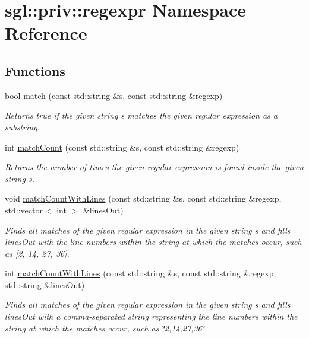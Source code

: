 \hypertarget{namespacesgl_1_1priv_1_1regexpr}{}\section{sgl\+:\+:priv\+:\+:regexpr Namespace Reference}
\label{namespacesgl_1_1priv_1_1regexpr}
\subsection*{Functions}
\begin{DoxyCompactItemize}
\item 
bool \mbox{\hyperlink{namespacesgl_1_1priv_1_1regexpr_ac209c2d2280a26805a88a5830572c4e8}{match}} (const std\+::string \&s, const std\+::string \&regexp)
\begin{DoxyCompactList}\small\item\em Returns true if the given string s matches the given regular expression as a substring. \end{DoxyCompactList}\item 
int \mbox{\hyperlink{namespacesgl_1_1priv_1_1regexpr_ae0041d7f4268e3f1cc914a014b4c6966}{match\+Count}} (const std\+::string \&s, const std\+::string \&regexp)
\begin{DoxyCompactList}\small\item\em Returns the number of times the given regular expression is found inside the given string s. \end{DoxyCompactList}\item 
void \mbox{\hyperlink{namespacesgl_1_1priv_1_1regexpr_a5854e1254f8393744e2c10c998197f96}{match\+Count\+With\+Lines}} (const std\+::string \&s, const std\+::string \&regexp, std\+::vector$<$ int $>$ \&lines\+Out)
\begin{DoxyCompactList}\small\item\em Finds all matches of the given regular expression in the given string s and fills \textquotesingle{}lines\+Out\textquotesingle{} with the line numbers within the string at which the matches occur, such as \mbox{[}2, 14, 27, 36\mbox{]}. \end{DoxyCompactList}\item 
int \mbox{\hyperlink{namespacesgl_1_1priv_1_1regexpr_a5563a971ef7227d5d4f363243dfed74d}{match\+Count\+With\+Lines}} (const std\+::string \&s, const std\+::string \&regexp, std\+::string \&lines\+Out)
\begin{DoxyCompactList}\small\item\em Finds all matches of the given regular expression in the given string s and fills \textquotesingle{}lines\+Out\textquotesingle{} with a comma-\/separated string representing the line numbers within the string at which the matches occur, such as \char`\"{}2,14,27,36\char`\"{}. \end{DoxyCompactList}\item 

\end{DoxyCompactItemize}
